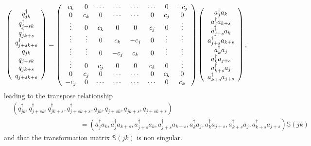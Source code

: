 \documentclass[aps,preprint]{revtex4}%
\begin{document}
\begin{equation}
\left(
\begin{array}
[c]{c}%
q_{jk}^{\dagger}\\
q_{j+sk}^{\dagger}\\
q_{jk+s}^{\dagger}\\
q_{j+sk+s}^{\dagger}\\
q_{jk}\\
q_{j+sk}\\
q_{jk+s}\\
q_{j+sk+s}%
\end{array}
\right)  =\left(
\begin{array}
[c]{cccccccc}%
c_{k} & 0 & \cdots & \cdots & \cdots & \cdots & 0 & -c_{j}\\
0 & c_{k} & 0 & \cdots & \cdots & 0 & c_{j} & 0\\
\vdots & 0 & c_{k} & 0 & 0 & c_{j} & 0 & \vdots\\
\vdots & \vdots & 0 & c_{k} & -c_{j} & 0 & \vdots & \vdots\\
\vdots & \vdots & 0 & -c_{j} & c_{k} & 0 & \vdots & \vdots\\
\vdots & 0 & c_{j} & 0 & 0 & c_{k} & 0 & \vdots\\
0 & c_{j} & 0 & \cdots & \cdots & 0 & c_{k} & 0\\
-c_{j} & 0 & \cdots & \cdots & \cdots & \cdots & 0 & c_{k}%
\end{array}
\right)  \left(
\begin{array}
[c]{c}%
a_{j}^{\dagger}a_{k}\\
a_{j}^{\dagger}a_{k+s}\\
a_{j+s}^{\dagger}a_{k}\\
a_{j+s}^{\dagger}a_{k+s}\\
a_{k}^{\dagger}a_{j}\\
a_{k}^{\dagger}a_{j+s}\\
a_{k+s}^{\dagger}a_{j}\\
a_{k+s}^{\dagger}a_{j+s}%
\end{array}
\right)  ,
\end{equation}
leading to the transpose relationship
\begin{align}
&  \left(  q_{jk}^{\dagger},q_{j+sk}^{\dagger},q_{jk+s}^{\dagger}%
,q_{j+sk+s}^{\dagger},q_{jk},q_{j+sk},q_{jk+s},q_{j+sk+s}\right)  \nonumber\\
&  \qquad\qquad\qquad\qquad\qquad\left.  =\right.  \left(  a_{j}^{\dagger
}a_{k},a_{j}^{\dagger}a_{k+s},a_{j+s}^{\dagger}a_{k},a_{j+s}^{\dagger}%
a_{k+s},a_{k}^{\dagger}a_{j},a_{k}^{\dagger}a_{j+s},a_{k+s}^{\dagger}%
a_{j},a_{k+s}^{\dagger}a_{j+s}\right)  \mathbb{S}\left(  jk\right)
\end{align}
and that the transformation matrix $\mathbb{S}\left(  jk\right)  $ is non singular.
\end{document}
